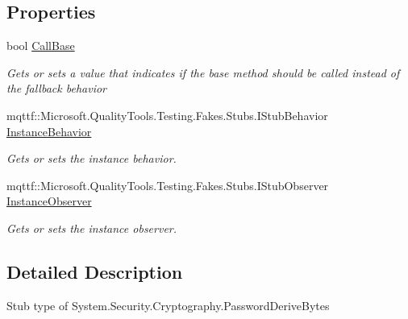\subsection*{Properties}
\begin{DoxyCompactItemize}
\item 
bool \hyperlink{class_system_1_1_security_1_1_cryptography_1_1_fakes_1_1_stub_password_derive_bytes_acf32fb0b30f66be256d80165a1619503}{Call\-Base}
\begin{DoxyCompactList}\small\item\em Gets or sets a value that indicates if the base method should be called instead of the fallback behavior\end{DoxyCompactList}\item 
mqttf\-::\-Microsoft.\-Quality\-Tools.\-Testing.\-Fakes.\-Stubs.\-I\-Stub\-Behavior \hyperlink{class_system_1_1_security_1_1_cryptography_1_1_fakes_1_1_stub_password_derive_bytes_af7393ea9db786edf3ab0d2cd3e4be2e7}{Instance\-Behavior}
\begin{DoxyCompactList}\small\item\em Gets or sets the instance behavior.\end{DoxyCompactList}\item 
mqttf\-::\-Microsoft.\-Quality\-Tools.\-Testing.\-Fakes.\-Stubs.\-I\-Stub\-Observer \hyperlink{class_system_1_1_security_1_1_cryptography_1_1_fakes_1_1_stub_password_derive_bytes_a9e855930550da80fa4e517e284e424ae}{Instance\-Observer}
\begin{DoxyCompactList}\small\item\em Gets or sets the instance observer.\end{DoxyCompactList}\end{DoxyCompactItemize}


\subsection{Detailed Description}
Stub type of System.\-Security.\-Cryptography.\-Password\-Derive\-Bytes



